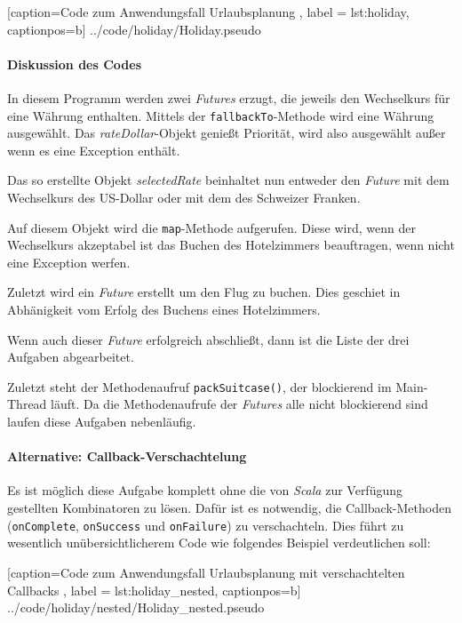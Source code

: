 
    [caption={Code zum Anwendungsfall \glqq Urlaubsplanung\grqq{} },
       label = lst:holiday,
       captionpos=b]
 {../code/holiday/Holiday.pseudo}
 
\paragraph{Diskussion des Codes}

In diesem Programm werden zwei \emph{Futures} erzugt, die jeweils
den Wechselkurs für eine Währung enthalten. Mittels der
\texttt{fallbackTo}-Methode wird eine Währung ausgewählt.
Das \emph{rateDollar}-Objekt genießt Priorität, wird also ausgewählt
außer wenn es eine Exception enthält.

Das so erstellte Objekt \emph{selectedRate} beinhaltet nun entweder
den \emph{Future} mit dem Wechselkurs des US-Dollar oder mit dem des
Schweizer Franken.

Auf diesem Objekt wird die \texttt{map}-Methode aufgerufen. Diese wird,
wenn der Wechselkurs akzeptabel ist das Buchen des Hotelzimmers beauftragen,
wenn nicht eine Exception werfen.

Zuletzt wird ein \emph{Future} erstellt um den Flug zu buchen. Dies
geschiet in Abhänigkeit vom Erfolg des Buchens eines Hotelzimmers.

Wenn auch dieser \emph{Future} erfolgreich abschließt, dann ist die
Liste der drei Aufgaben abgearbeitet.

Zuletzt steht der Methodenaufruf \texttt{packSuitcase()}, der blockierend
im Main-Thread läuft. Da die Methodenaufrufe der \emph{Futures} alle
nicht blockierend sind laufen diese Aufgaben nebenläufig.

\paragraph{Alternative: Callback-Verschachtelung} Es ist möglich
diese Aufgabe komplett ohne die von \emph{Scala} zur Verfügung gestellten
Kombinatoren zu lösen. Dafür ist es notwendig, die Callback-Methoden
(\texttt{onComplete}, \texttt{onSuccess} und \texttt{onFailure}) zu
verschachteln. Dies führt zu wesentlich unübersichtlicherem Code
wie folgendes Beispiel verdeutlichen soll:


    [caption={Code zum Anwendungsfall \glqq Urlaubsplanung\grqq{} mit verschachtelten Callbacks },
       label = lst:holiday_nested,
       captionpos=b]
 {../code/holiday/nested/Holiday_nested.pseudo}

